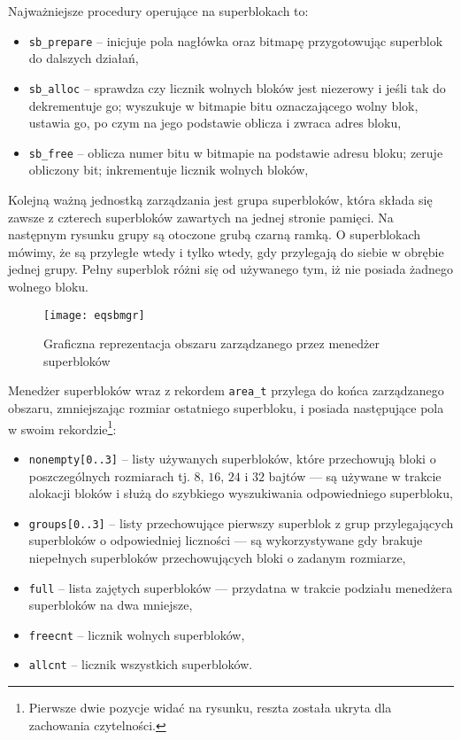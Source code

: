 \documentclass[12pt,a4paper,titlepage,twoside]{mwart}
\begin{document}
Najważniejsze procedury operujące na superblokach to:
\begin{itemize}
\item \verb+sb_prepare+ -- inicjuje pola nagłówka oraz bitmapę przygotowując
superblok do dalszych działań,
\item \verb+sb_alloc+ -- sprawdza czy licznik wolnych bloków jest niezerowy i
jeśli tak do dekrementuje go; wyszukuje w bitmapie bitu oznaczającego wolny
blok, ustawia go, po czym na jego podstawie oblicza i zwraca adres bloku,
\item \verb+sb_free+ -- oblicza numer bitu w bitmapie na podstawie adresu
bloku; zeruje obliczony bit; inkrementuje licznik wolnych bloków,
\end{itemize}

Kolejną ważną jednostką zarządzania jest grupa superbloków, która składa się
zawsze z czterech superbloków zawartych na jednej stronie pamięci. Na następnym
rysunku grupy są otoczone grubą czarną ramką. O superblokach mówimy, że są
przyległe wtedy i tylko wtedy, gdy przylegają do siebie w obrębie jednej grupy.
Pełny superblok różni się od używanego tym, iż nie posiada żadnego wolnego bloku.

\begin{figure}[ht]
\centering
\texttt{[image: eqsbmgr]}
\caption{Graficzna reprezentacja obszaru zarządzanego przez menedżer superbloków}
\end{figure}

Menedżer superbloków wraz z rekordem \texttt{area\_t} przylega do końca
zarządzanego obszaru, zmniejszając rozmiar ostatniego superbloku, i posiada
następujące pola w swoim rekordzie\footnote{Pierwsze dwie pozycje widać na
rysunku, reszta została ukryta dla zachowania czytelności.}:
\begin{itemize}
\item \verb+nonempty[0..3]+ -- listy używanych superbloków, które przechowują
bloki o poszczególnych rozmiarach tj. $8$, $16$, $24$ i $32$ bajtów --- są
używane w trakcie alokacji bloków i służą do szybkiego wyszukiwania
odpowiedniego superbloku,
\item \verb+groups[0..3]+ -- listy przechowujące pierwszy superblok z grup
przylegających superbloków o odpowiedniej liczności --- są wykorzystywane gdy
brakuje niepełnych superbloków przechowujących bloki o zadanym rozmiarze,
\item \verb+full+ -- lista zajętych superbloków --- przydatna w trakcie
podziału menedżera superbloków na dwa mniejsze,
\item \verb+freecnt+ -- licznik wolnych superbloków,
\item \verb+allcnt+ -- licznik wszystkich superbloków.
\end{itemize}
\end{document}
